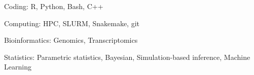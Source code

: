 Coding: R, Python, Bash, C++

Computing: HPC, SLURM, Snakemake, git

Bioinformatics: Genomics, Transcriptomics

Statistics: Parametric statistics, Bayesian, Simulation-based inference, Machine Learning
